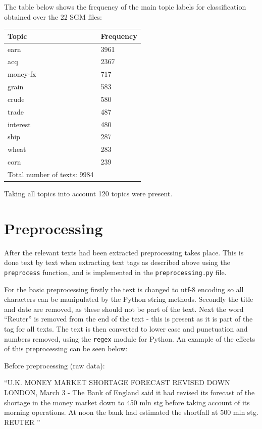 \documentclass{article}
\begin{document}
The table below shows the frequency of the main topic labels for classification obtained over the 22 SGM files:
\\
\begin{center}
\begin{tabular}{l | l}
Topic & Frequency \\ \hline
earn & 3961 \\
acq & 2367 \\
money-fx & 717 \\
grain & 583 \\
crude & 580 \\
trade & 487 \\
interest & 480 \\
ship & 287 \\
wheat & 283 \\
corn & 239 \\ \hline
Total number of texts: 9984 \\
\end{tabular}
\end{center}

Taking all topics into account 120 topics were present.

\section{Preprocessing}
After the relevant texts had been extracted preprocessing takes place. This is done text by text when extracting text tags as described above using the \verb|preprocess| function, and is implemented in the \verb|preprocessing.py| file.

For the basic preprocessing firstly the text is changed to utf-8 encoding so all characters can be manipulated by the Python string methods. Secondly the title and date are removed, as these should not be part of the text. Next the word ``Reuter'' is removed from the end of the text - this is present as it is part of the tag for all texts. The text is then converted to lower case and punctuation and numbers removed, using the \verb|regex| module for Python. An example of the effects of this preprocessing can be seen below:

Before preprocessing (raw data):

``U.K. MONEY MARKET SHORTAGE FORECAST REVISED DOWN
    LONDON, March 3 - The Bank of England said it had revised
its forecast of the shortage in the money market down to 450
mln stg before taking account of its morning operations. At
noon the bank had estimated the shortfall at 500 mln stg.
 REUTER
''
\end{document}
